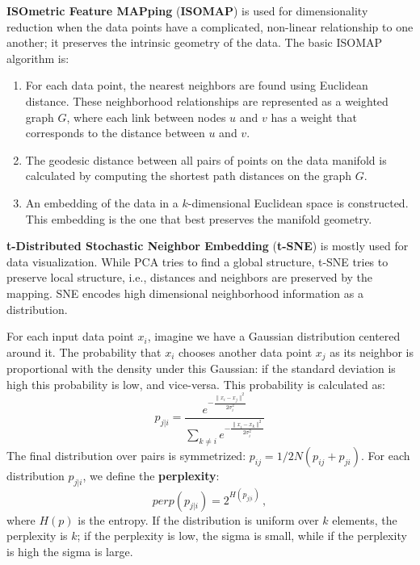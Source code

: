 \textbf{ISOmetric Feature MAPping} (\textbf{ISOMAP}) is used for dimensionality reduction when the data points have a complicated, non-linear relationship to one another; it preserves the intrinsic geometry of the data. The basic ISOMAP algorithm is:
\begin{enumerate}
    \item For each data point, the nearest neighbors are found using Euclidean distance. These neighborhood relationships are represented as a weighted graph $G$, where each link between nodes $u$ and $v$ has a weight that corresponds to the distance between $u$ and $v$.

    \item The geodesic distance between all pairs of points on the data manifold is calculated by computing the shortest path distances on the graph $G$.

    \item An embedding of the data in a $k$-dimensional Euclidean space is constructed. This embedding is the one that best preserves the manifold geometry.
\end{enumerate}

\textbf{t-Distributed Stochastic Neighbor Embedding} (\textbf{t-SNE}) is mostly used for data visualization. While PCA tries to find a global structure, t-SNE tries to preserve local structure, i.e., distances and neighbors are preserved by the mapping. SNE encodes high dimensional neighborhood information as a distribution.

For each input data point $x_i$, imagine we have a Gaussian distribution centered around it. The probability that $x_i$ chooses another data point $x_j$ as its neighbor is proportional with the density under this Gaussian: if the standard deviation is high this probability is low, and vice-versa. This probability is calculated as:
\begin{equation*}
    p_{j|i} = \dfrac{e^{-\frac{\|x_i - x_j\|^2}{2 \sigma_i^2}}}{\sum_{k \neq i} e^{-\frac{\|x_i - x_k\|^2}{2 \sigma_i^2}}}
\end{equation*}
The final distribution over pairs is symmetrized: $p_{ij} = 1 / 2N(p_{ij} + p_{ji})$. For each distribution $p_{j|i}$, we define the \textbf{perplexity}:
\begin{equation*}
    \textit{perp}(p_{j|i}) = 2^{H(p_{j|i})} \,,
\end{equation*}
where $H(p)$ is the entropy. If the distribution is uniform over $k$ elements, the perplexity is $k$; if the perplexity is low, the sigma is small, while if the perplexity is high the sigma is large.

